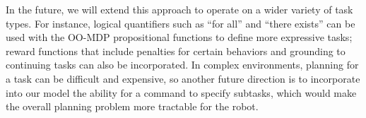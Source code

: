 \documentclass[conference]{IEEEtran}
\begin{document}
In the future, we will extend this approach to operate on a wider variety of task types. For instance, logical quantifiers such as ``for all'' and ``there exists'' can be used with the OO-MDP propositional functions to define more expressive tasks; reward functions that include penalties for certain behaviors and grounding to continuing tasks can also be incorporated. %
In complex environments, planning for a task can be difficult and expensive, so another future direction is to incorporate into our model the ability for a command to specify subtasks, which would make the overall planning problem more tractable for the robot. 





 

 
\end{document}
